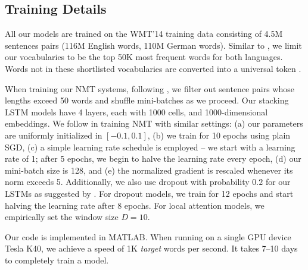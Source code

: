 \subsection{Training Details}
All our models are trained on the WMT'14 training data consisting of 4.5M
sentences pairs (116M English words, 110M German words). Similar to \cite{jean15}, we limit our vocabularies to be the top 50K most frequent words for both languages. Words not in these shortlisted vocabularies are converted into a universal token \unk{}. 


When training our NMT systems, following \cite{bog15,jean15}, we filter out
sentence pairs whose lengths exceed 50 words and shuffle mini-batches as we
proceed. Our stacking LSTM models have 4 layers, each with 1000 cells, and
1000-dimensional embeddings. We follow \cite{sutskever14,luong15} in training
NMT with similar settings: (a) our parameters are uniformly initialized in
$[-0.1, 0.1]$, (b) we train for 10 epochs using plain SGD, (c) a simple learning
rate schedule is employed -- we start with a learning rate of 1; after 5 epochs,
we begin to halve the learning rate every epoch, (d) our mini-batch size is 128,
and (e) the normalized gradient is rescaled whenever its norm exceeds 5.
Additionally, we also use dropout with probability $0.2$ for our LSTMs as suggested by
\cite{zaremba14}. For dropout models, we train for 12 epochs and start halving
the learning rate after 8 epochs. For local
attention models, we empirically set the window size $D=10$.

Our code is implemented in MATLAB. %
When running on a single GPU device Tesla K40, we achieve a speed of 1K {\it
target} words per second. It takes 7--10 days to completely train a model.

